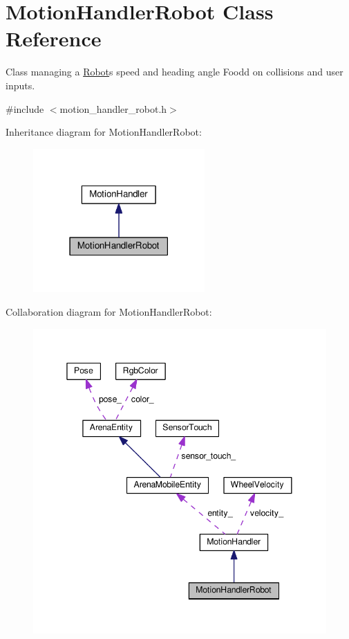 \hypertarget{classMotionHandlerRobot}{}\section{Motion\+Handler\+Robot Class Reference}
\label{classMotionHandlerRobot}


Class managing a \hyperlink{classRobot}{Robot}\textquotesingle{}s speed and heading angle Foodd on collisions and user inputs.  




{\ttfamily \#include $<$motion\+\_\+handler\+\_\+robot.\+h$>$}



Inheritance diagram for Motion\+Handler\+Robot\+:\nopagebreak
\begin{figure}[H]
\begin{center}
\leavevmode
\includegraphics[width=186pt]{classMotionHandlerRobot__inherit__graph}
\end{center}
\end{figure}


Collaboration diagram for Motion\+Handler\+Robot\+:\nopagebreak
\begin{figure}[H]
\begin{center}
\leavevmode
\includegraphics[width=345pt]{classMotionHandlerRobot__coll__graph}
\end{center}
\end{figure}
